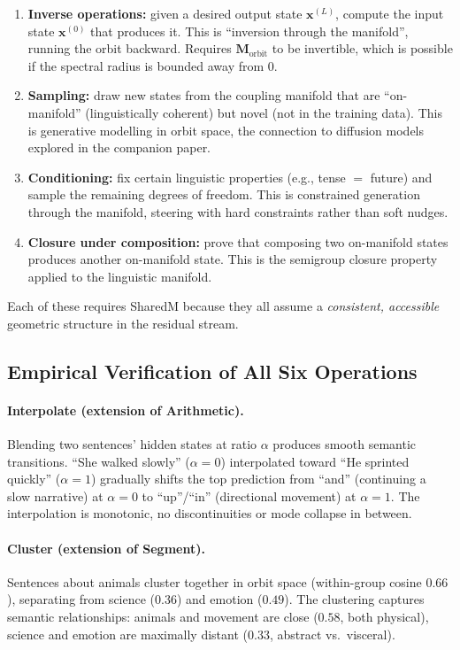 \documentclass[11pt, a4paper]{article}
\newcommand{\M}{\mathbf{M}}
\newcommand{\x}{\mathbf{x}}
\theoremstyle{plain}
\theoremstyle{definition}
\theoremstyle{remark}
\begin{document}
\begin{enumerate}[leftmargin=*]
\item \textbf{Inverse operations:} given a desired output state $\x^{(L)}$, compute the input state $\x^{(0)}$ that produces it.
    This is ``inversion through the manifold'', running the orbit backward.
    Requires $\M_{\text{orbit}}$ to be invertible, which is possible if the spectral radius is bounded away from 0.

\item \textbf{Sampling:} draw new states from the coupling manifold that are ``on-manifold'' (linguistically coherent) but novel (not in the training data).
    This is generative modelling in orbit space, the connection to diffusion models explored in the companion paper.

\item \textbf{Conditioning:} fix certain linguistic properties (e.g., tense $=$ future) and sample the remaining degrees of freedom.
    This is constrained generation through the manifold, steering with hard constraints rather than soft nudges.

\item \textbf{Closure under composition:} prove that composing two on-manifold states produces another on-manifold state.
    This is the semigroup closure property applied to the linguistic manifold.
\end{enumerate}

Each of these requires SharedM because they all assume a \emph{consistent, accessible} geometric structure in the residual stream.

\subsection{Empirical Verification of All Six Operations}

\paragraph{Interpolate (extension of Arithmetic).}
Blending two sentences' hidden states at ratio $\alpha$ produces smooth semantic transitions.
``She walked slowly'' ($\alpha{=}0$) interpolated toward ``He sprinted quickly'' ($\alpha{=}1$) gradually shifts the top prediction from ``and'' (continuing a slow narrative) at $\alpha{=}0$ to ``up''/``in'' (directional movement) at $\alpha{=}1$.
The interpolation is monotonic, no discontinuities or mode collapse in between.

\paragraph{Cluster (extension of Segment).}
Sentences about animals cluster together in orbit space (within-group cosine $0.66$), separating from science ($0.36$) and emotion ($0.49$).
The clustering captures semantic relationships: animals and movement are close ($0.58$, both physical), science and emotion are maximally distant ($0.33$, abstract vs.\ visceral).
\end{document}
